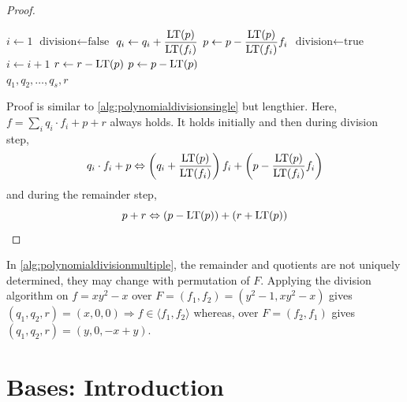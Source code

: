 \documentclass[a4paper,11pt]{article}
\begin{document}
\begin{proof}
\begin{center}
\begin{algorithm}
\begin{algorithmic}
            \State $i \gets 1$
            \State $\text{division} \gets \text{false}$
                    \State $q_i \gets q_i+\dfrac{\operatorname{LT}(p)}{\operatorname{LT}(f_i)}$
                    \State $p \gets p-\dfrac{\operatorname{LT}(p)}{\operatorname{LT}(f_i)}f_i$
                    \State $\text{division} \gets \text{true}$
                \Else
                    \State $i \gets i+1$
                \EndIf
            \EndWhile
                \State $r \gets r-\operatorname{LT}(p)$
                \State $p \gets p-\operatorname{LT}(p)$
            \EndIf
        \EndWhile \\
        \Return $q_1,q_2,\ldots,q_s,r$
        \end{algorithmic}
        \end{algorithm}
    \end{center}
    Proof is similar to \ref{alg:polynomialdivisionsingle} but lengthier.
    Here, $f=\displaystyle\sum_{i}q_i\cdot f_i+p+r$ always holds. It holds initially and then during division step,
    \begin{equation}
        q_i\cdot f_i+p \Leftrightarrow
        \left(q_i+\dfrac{\operatorname{LT}(p)}{\operatorname{LT}(f_i)}\right)f_i+\left(p-\dfrac{\operatorname{LT}(p)}{\operatorname{LT}(f_i)}f_i\right)
    \end{equation}
    and during the remainder step,
    \begin{equation}
        p+r \Leftrightarrow
        (p-\operatorname{LT}(p))+(r+\operatorname{LT}(p))
    \end{equation}
\end{proof}
\begin{note}
    In \ref{alg:polynomialdivisionmultiple}, the remainder and quotients are not uniquely determined, they may change with permutation of $F$. Applying the division algorithm on $f=xy^2-x$ over $F=(f_1,f_2)=(y^2-1, xy^2-x)$ gives $(q_1,q_2,r)=(x,0,0)\Rightarrow f\in \langle f_1,f_2\rangle$ whereas, over $F=(f_2,f_1)$ gives $(q_1,q_2,r)=(y,0,-x+y)$.\
\end{note}
\clearpage
\part{\Grob Bases: Introduction}
\end{document}

